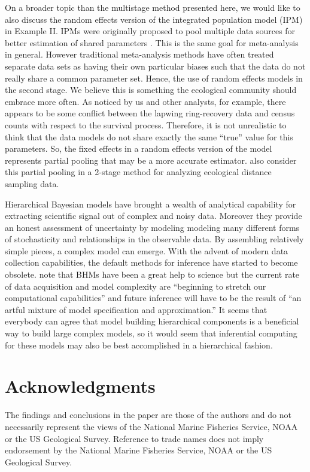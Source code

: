 \documentclass[12pt]{article}
\begin{document}
On a broader topic than the multistage method presented here, we would like to also discuss the random effects version of the integrated population model (IPM) in Example II. IPMs were originally proposed to pool 
multiple data sources for better estimation of shared parameters \citep{schaub2011integrated}. This is the same goal for meta-analysis in general. However traditional meta-analysis methods have often treated separate data sets as having their own particular biases such that the data do not really share a common parameter set. Hence, the use of random effects models in the second stage. We believe this is something the ecological community should embrace more often. As noticed by us and other analysts, for example, there appears to be some conflict between the lapwing ring-recovery data and census counts with respect to the survival process. Therefore, it is not unrealistic to think that the data models do not share exactly the same ``true'' value for this parameters. So, the fixed effects in a random effects version of the model represents partial pooling that may be a more accurate estimator. \cite{bravington2018reliable} also consider this partial pooling in a 2-stage method for analyzing ecological distance sampling data. 

Hierarchical Bayesian models have brought a wealth of analytical capability for extracting scientific signal out of complex and noisy data. Moreover they provide an honest assessment of uncertainty by modeling modeling many different forms of stochasticity and relationships in the observable data. By assembling relatively simple pieces, a complex model can emerge. With the advent of modern data collection capabilities, the default methods for inference have started to become obsolete. \citet{gelfand2015hierarchical} note that BHMs have been a great help to science but the current rate of data acquisition and model complexity are ``beginning to stretch our computational capabilities'' and future inference will have to be the result of ``an artful mixture of model specification and approximation.'' It seems that everybody can agree that model building hierarchical components is a beneficial way to build large complex models, so it would seem that inferential computing for these models may also be best accomplished in a hierarchical fashion. 




\section*{Acknowledgments}
The findings and conclusions in the paper are those of the authors and do not necessarily represent the views of the National Marine Fisheries Service, NOAA or the US Geological Survey. Reference to trade names does not imply endorsement by the National Marine Fisheries Service, NOAA or the US Geological Survey.
\end{document}
